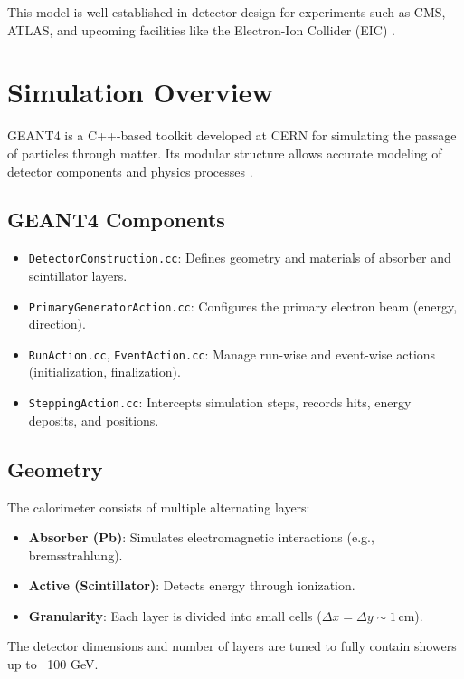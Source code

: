 \documentclass[11pt]{article}
\begin{document}
This model is well-established in detector design for experiments such as CMS, ATLAS, and upcoming facilities like the Electron-Ion Collider (EIC) \cite{cms_ecal_tdr, atlas_lar_tdr}.

\section{Simulation Overview}

GEANT4 is a C++-based toolkit developed at CERN for simulating the passage of particles through matter. Its modular structure allows accurate modeling of detector components and physics processes \cite{geant4_manual}.

\subsection*{GEANT4 Components}
\begin{itemize}
  \item \texttt{DetectorConstruction.cc}: Defines geometry and materials of absorber and scintillator layers.
  \item \texttt{PrimaryGeneratorAction.cc}: Configures the primary electron beam (energy, direction).
  \item \texttt{RunAction.cc}, \texttt{EventAction.cc}: Manage run-wise and event-wise actions (initialization, finalization).
  \item \texttt{SteppingAction.cc}: Intercepts simulation steps, records hits, energy deposits, and positions.
\end{itemize}

\subsection*{Geometry}
The calorimeter consists of multiple alternating layers:
\begin{itemize}
  \item \textbf{Absorber (Pb)}: Simulates electromagnetic interactions (e.g., bremsstrahlung).
  \item \textbf{Active (Scintillator)}: Detects energy through ionization.
  \item \textbf{Granularity}: Each layer is divided into small cells (\( \Delta x = \Delta y \sim 1\,\mathrm{cm} \)).
\end{itemize}

The detector dimensions and number of layers are tuned to fully contain showers up to ~100 GeV.
\end{document}
